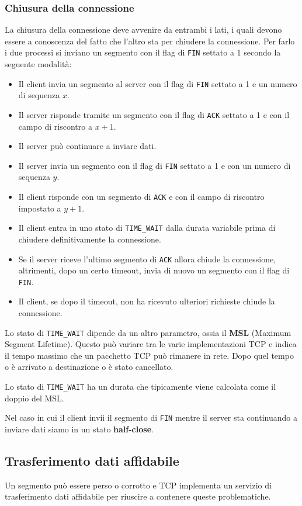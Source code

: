 \subsubsection{Chiusura della connessione}
La chiusura della connessione deve avvenire da entrambi i lati, i quali devono essere a conoscenza
del fatto che l'altro sta per chiudere la connessione. Per farlo i due processi si inviano un
segmento con il flag di \verb|FIN| settato a 1 secondo la seguente modalità:
\begin{itemize}
	\item Il client invia un segmento al server con il flag di \verb|FIN| settato a 1 e un numero
	      di sequenza $x$.
	\item Il server risponde tramite un segmento con il flag di \verb|ACK| settato a 1 e con il
	      campo di riscontro a $x+1$.
	\item Il server può continuare a inviare dati.
	\item Il server invia un segmento con il flag di \verb|FIN| settato a 1 e con un numero di
	      sequenza $y$.
	\item Il client risponde con un segmento di \verb|ACK| e con il campo di riscontro impostato
	      a $y+1$.
	\item Il client entra in uno stato di \verb|TIME_WAIT| dalla durata variabile prima di
	      chiudere definitivamente la connessione.
	\item Se il server riceve l'ultimo segmento di \verb|ACK| allora chiude la connessione,
	      altrimenti, dopo un certo timeout, invia di nuovo un segmento con il flag di \verb|FIN|.
	\item Il client, se dopo il timeout, non ha ricevuto ulteriori richieste chiude la
	      connessione.
\end{itemize}
Lo stato di \verb|TIME_WAIT| dipende da un altro parametro, ossia il \textbf{MSL} (Maximum Segment
Lifetime). Questo può variare tra le varie implementazioni TCP e indica il tempo massimo che un
pacchetto TCP può rimanere in rete. Dopo quel tempo o è arrivato a destinazione o è stato
cancellato.

Lo stato di \verb|TIME_WAIT| ha un durata che tipicamente viene calcolata come il doppio del MSL.

Nel caso in cui il client invii il segmento di \verb|FIN| mentre il server sta continuando a
inviare dati siamo in un stato \textbf{half-close}.

\subsection{Trasferimento dati affidabile}
Un segmento può essere perso o corrotto e TCP implementa un servizio di trasferimento dati
affidabile per riuscire a contenere queste problematiche.

